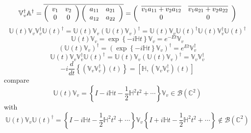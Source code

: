 \documentclass[aps,preprint]{revtex4}%
\begin{document}
\begin{equation}
\mathbb{V}_{v}^{\dagger}\mathbb{A}^{\dagger}=\overline{\left(
\begin{array}
[c]{cc}%
v_{1} & v_{2}\\
0 & 0
\end{array}
\right)  \left(
\begin{array}
[c]{cc}%
a_{11} & a_{21}\\
a_{12} & a_{22}%
\end{array}
\right)  }=\left(
\begin{array}
[c]{cc}%
\overline{v_{1}a_{11}+v_{2}a_{12}} & \overline{v_{1}a_{21}+v_{2}a_{22}}\\
0 & 0
\end{array}
\right)
\end{equation}%
\begin{equation}
\mathbb{U}\left(  t\right)  \mathbb{V}_{v}\mathbb{V}_{v}^{\dagger}%
\mathbb{U}\left(  t\right)  ^{\dagger}=\mathbb{U}\left(  t\right)
\mathbb{V}_{v}\left(  \mathbb{U}\left(  t\right)  \mathbb{V}_{v}\right)
^{\dagger}=\mathbb{U}\left(  t\right)  \mathbb{V}_{v}\mathbb{U}\left(
t\right)  ^{\dagger}\mathbb{U}\left(  t\right)  \mathbb{V}_{v}^{\dagger
}\mathbb{U}\left(  t\right)  ^{\dagger}%
\end{equation}%
\begin{equation}
\mathbb{U}\left(  t\right)  \mathbb{V}_{v}=\exp\left\{  -i\mathbb{H}t\right\}
\mathbb{V}_{v}=e^{-Et}\mathbb{V}_{v}%
\end{equation}%
\begin{equation}
\left(  \mathbb{U}\left(  t\right)  \mathbb{V}_{v}\right)  ^{\dagger}=\left(
\exp\left\{  -i\mathbb{H}t\right\}  \mathbb{V}_{v}\right)  ^{\dagger}%
=e^{Et}\mathbb{V}_{v}^{\dagger}%
\end{equation}%
\begin{equation}
\mathbb{U}\left(  t\right)  \mathbb{V}_{v}\mathbb{V}_{v}^{\dagger}%
\mathbb{U}\left(  t\right)  ^{\dagger}=\mathbb{U}\left(  t\right)
\mathbb{V}_{v}\left(  \mathbb{U}\left(  t\right)  \mathbb{V}_{v}\right)
^{\dagger}=\mathbb{V}_{v}\mathbb{V}_{v}^{\dagger}%
\end{equation}%
\begin{equation}
-i\frac{d}{dt}\left\{  \left(  \mathbb{V}_{v}\mathbb{V}_{v}^{\dagger}\right)
\left(  t\right)  \right\}  =\left[  \mathbb{H},\left(  \mathbb{V}%
_{v}\mathbb{V}_{v}^{\dagger}\right)  \left(  t\right)  \right]
\end{equation}
compare
\begin{equation}
\mathbb{U}\left(  t\right)  \mathbb{V}_{v}=\left\{  I-i\mathbb{H}t-\frac{1}%
{2}\mathbb{H}^{2}t^{2}+\cdots\right\}  \mathbb{V}_{v}\in\mathcal{B}\left(
\mathbb{C}^{2}\right)
\end{equation}
with
\begin{equation}
\mathbb{U}\left(  t\right)  \mathbb{V}_{v}\mathbb{U}\left(  t\right)
^{\dagger}=\left\{  I-i\mathbb{H}t-\frac{1}{2}\mathbb{H}^{2}t^{2}%
+\cdots\right\}  \mathbb{V}_{v}\left\{  I+i\mathbb{H}t-\frac{1}{2}%
\mathbb{H}^{2}t^{2}+\cdots\right\}  \notin\mathcal{B}\left(  \mathbb{C}%
^{2}\right)
\end{equation}
%
\end{document}
